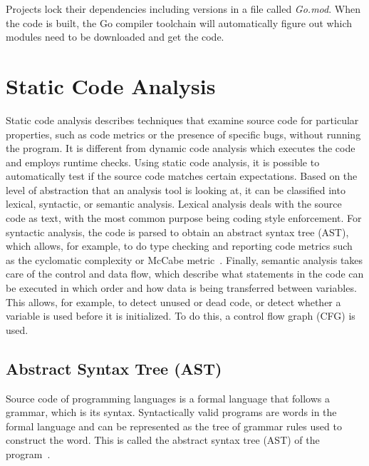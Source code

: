 

Projects lock their dependencies including versions in a file called \textit{Go.mod}.
When the code is built, the Go compiler toolchain will automatically figure out which modules need to be downloaded and
get the code.



\section{Static Code Analysis}\label{sec:background:static-code-analysis}

Static code analysis describes techniques that examine source code for particular properties, such as code metrics or
the presence of specific bugs, without running the program.
It is different from dynamic code analysis which executes the code and employs runtime checks.
Using static code analysis, it is possible to automatically test if the source code matches certain expectations.
Based on the level of abstraction that an analysis tool is looking at, it can be classified into lexical, syntactic,
or semantic analysis.
Lexical analysis deals with the source code as text, with the most common purpose being coding style enforcement.
For syntactic analysis, the code is parsed to obtain an abstract syntax tree (\acrshort{AST}), which allows, for
example, to do type checking and reporting code metrics such as the cyclomatic complexity or McCabe
metric~\cite{watson1996}.
Finally, semantic analysis takes care of the control and data flow, which describe what statements in the code can
be executed in which order and how data is being transferred between variables.
This allows, for example, to detect unused or dead code, or detect whether a variable is used before it is initialized.
To do this, a control flow graph (\acrshort{CFG}) is used.



\subsection{Abstract Syntax Tree (AST)}\label{subsec:background:static-code-analysis:ast}

Source code of programming languages is a formal language that follows a grammar, which is its syntax.
Syntactically valid programs are words in the formal language and can be represented as the tree of grammar rules used
to construct the word.
This is called the abstract syntax tree (\acrshort{AST}) of the program~\cite{cooper2011}.


